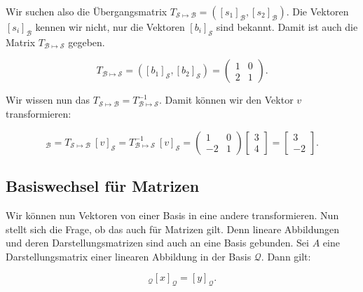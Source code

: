 \vspace{1\baselineskip}

Wir suchen also die Übergangsmatrix \( T_{{\mathcal{S}} \mapsto \mathcal{B}} = \left( [s_1]_\mathcal{B}, [s_2]_\mathcal{B} \right) \). Die Vektoren \( [s_i]_\mathcal{B} \) kennen wir nicht, nur die Vektoren \( [b_i]_\mathcal{S} \) sind bekannt. Damit ist auch die Matrix \( T_{{\mathcal{B}} \mapsto \mathcal{S}} \) gegeben.

\begin{equation*}
    T_{{\mathcal{B}} \mapsto \mathcal{S}} = \left( [b_1]_\mathcal{S}, [b_2]_\mathcal{S} \right) = \begin{pmatrix} 1 & 0 \\ 2 & 1 \end{pmatrix}.
\end{equation*}

Wir wissen nun das \( T_{{\mathcal{S}} \mapsto \mathcal{B}} = T_{{\mathcal{B}} \mapsto \mathcal{S}}^{-1} \). Damit können wir den Vektor \( v \) transformieren:

\begin{equation*}
    [v]_\mathcal{B} = T_{{\mathcal{S}} \mapsto \mathcal{B}} \ [v]_\mathcal{S} = T_{{\mathcal{B}} \mapsto \mathcal{S}}^{-1} \ [v]_\mathcal{S} = \begin{pmatrix} 1 & 0 \\ -2 & 1 \end{pmatrix} \begin{bmatrix} 3 \\ 4 \end{bmatrix} = \begin{bmatrix} 3 \\ -2 \end{bmatrix}.
\end{equation*}

\subsection{Basiswechsel für Matrizen}

Wir können nun Vektoren von einer Basis in eine andere transformieren. Nun stellt sich die Frage, ob das auch für Matrizen gilt. Denn lineare Abbildungen und deren Darstellungsmatrizen sind auch an eine Basis gebunden. Sei \( A \) eine Darstellungsmatrix einer linearen Abbildung in der Basis \( \mathcal{Q} \). Dann gilt:

\begin{equation*}
    [A]_\mathcal{Q} [x]_\mathcal{Q} = [y]_\mathcal{Q}.
\end{equation*}

